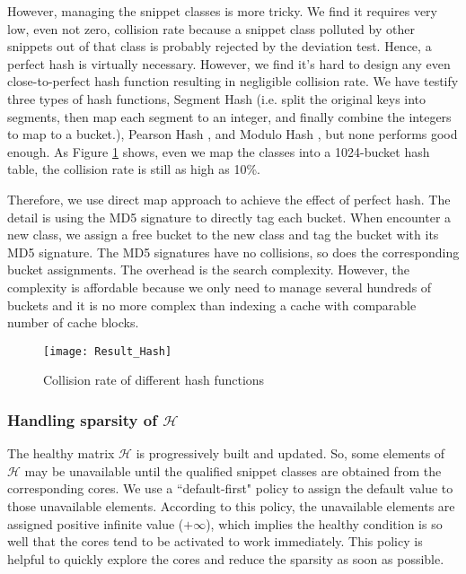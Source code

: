 However, managing the snippet classes is more tricky. We find it requires very low, even not zero, collision rate because a snippet class polluted by other snippets out of that class is probably rejected by the deviation test. Hence, a perfect hash is virtually necessary. However, we find it's hard to design any even close-to-perfect hash function resulting in negligible collision rate. We have testify three types of hash functions, Segment Hash (i.e. split the original keys into segments, then map each segment to an integer, and finally combine the integers to map to a bucket.), Pearson Hash \cite{pearsonhash}, and Modulo Hash \cite{modulo}, but none performs good enough. As Figure \ref{hashresult} shows, even we map the classes into a 1024-bucket hash table, the collision rate is still as high as 10\%.

Therefore, we use direct map approach to achieve the effect of perfect hash. The detail is using the MD5 signature to directly tag each bucket.  When encounter a new class, we assign a free bucket to the new class and tag the bucket with its MD5 signature. The MD5 signatures have no collisions, so does the corresponding bucket assignments.  The overhead is the search complexity. However, the complexity is affordable because we only need to manage several hundreds of buckets and it is no more complex than indexing a cache with comparable number of cache blocks.

\begin{figure}[t]
  \centering
  \texttt{[image: Result\_Hash]}\\
  \caption{Collision rate of different hash functions}\label{hashresult}
\end{figure}


\subsubsection{Handling sparsity of $\mathcal{H}$}
The healthy matrix $\mathcal{H}$ is progressively built and updated.  So, some elements of $\mathcal{H}$ may be unavailable until the  qualified snippet classes are obtained from the corresponding cores. We use a ``default-first" policy to assign the default value to those unavailable elements.  According to this policy,  the unavailable elements are assigned positive infinite value ($+\infty$), which implies the healthy condition is so well that the cores tend to be activated to work immediately.  This policy is helpful to quickly explore the cores and reduce the sparsity as soon as possible.

